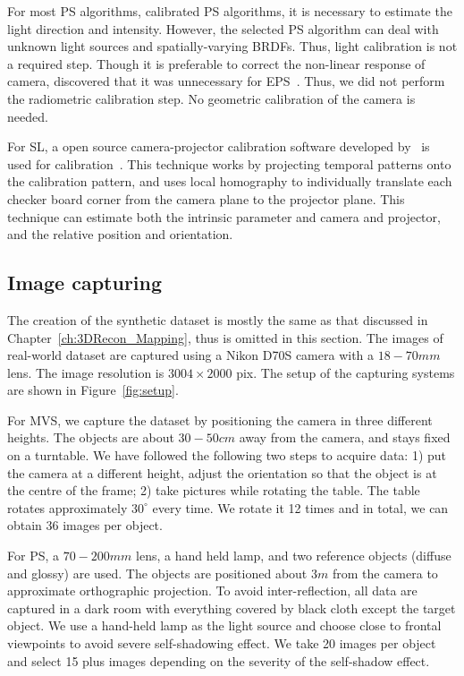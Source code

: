 For most PS algorithms, \ie calibrated PS algorithms, it is necessary to estimate the light direction and intensity. However, the selected PS algorithm can deal with unknown light sources and spatially-varying BRDFs. Thus, light calibration is not a required step. Though it is preferable to correct the non-linear response of camera, \citeauthor{hertzmann2005example} discovered that it was unnecessary for EPS~\cite{hertzmann2005example}. Thus, we did not perform the radiometric calibration step. No geometric calibration of the camera is needed.

For SL, a open source camera-projector calibration software developed by~\citeauthor{moreno2012simple} is used for calibration~\cite{moreno2012simple}. This technique works by projecting temporal patterns onto the calibration pattern, and uses local homography to individually translate each checker board corner from the camera plane to the projector plane. This technique can estimate both the intrinsic parameter and camera and projector, and the relative position and orientation.

\subsection{Image capturing}
The creation of the synthetic dataset is mostly the same as that discussed in Chapter~\ref{ch:3DRecon_Mapping}, thus is omitted in this section. The images of real-world dataset are captured using a Nikon D70S camera with a $18-70mm$ lens. The image resolution is $3004\times 2000$ pix. The setup of the capturing systems are shown in Figure~\ref{fig:setup}.

For MVS, we capture the dataset by positioning the camera in three different heights. The objects are about $30-50cm$ away from the camera, and stays fixed on a turntable. We have followed the following two steps to acquire data: 1) put the camera at a different height, adjust the orientation so that the object is at the centre of the frame; 2) take pictures while rotating the table. The table rotates approximately $30^\circ$ every time. We rotate it 12 times and in total, we can obtain 36 images per object.

For PS, a $70-200mm$ lens, a hand held lamp, and two reference objects (diffuse and glossy) are used. The objects are positioned about $3m$ from the camera to approximate orthographic projection. To avoid inter-reflection, all data are captured in a dark room with everything covered by black cloth except the target object. We use a hand-held lamp as the light source and choose close to frontal viewpoints to avoid severe self-shadowing effect. We take 20 images per object and select 15 plus images depending on the severity of the self-shadow effect.


